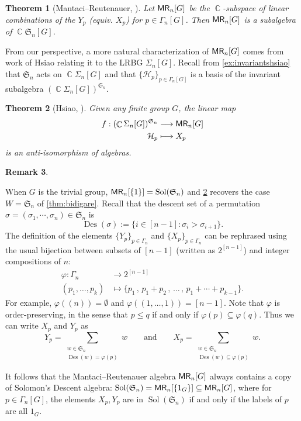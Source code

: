 \documentclass[11pt, oneside, reqno]{amsart}
\newtheorem{theorem}{Theorem}[section]
\theoremstyle{definition}
\newtheorem{remark}[theorem]{Remark}
\numberwithin{equation}{section}
\DeclareMathOperator{\C}{\mathbb{C}}
\DeclareMathOperator{\Des}{Des}
\def \MR {{\sf{MR}}}
\def \kk{\C}
\def \sym{\mathfrak{S}}
\def \gsetcomposition{{\Sigma_n[G]}}
\def \hsiao {{\gsetcomposition}}
\def\qqand{\qquad\text{and}\qquad}
\DeclareMathOperator{\sol}{Sol}
\newcommand{\SB}[1]{\mathcal{#1}} 		%
\begin{document}
\begin{theorem}[Mantaci--Reutenauer, \cite{MR95}]\label{thm/def:mralg}
    Let  $\MR_n[G]$ be the $\kk$-subspace of linear combinations of the $Y_{p}$ (equiv. $X_{p}$) for $p \in \Gamma_n[G]$.
    Then $\MR_n[G]$ is a subalgebra of $\kk \sym_n[G]$.
\end{theorem}

From our perspective, a more natural characterization of $\MR_n[G]$ comes from work of Hsiao relating it to the LRBG $\hsiao$.
Recall from \cref{ex:invariantshsiao} that $\sym_n$ acts on $\kk \hsiao$ and that $\{ \SB{H}_p \}_{p \in \Gamma_n[G]}$ is a basis of the invariant subalgebra $(\kk \hsiao)^{\sym_n}$.

\begin{theorem}[Hsiao, \cite{hsiao2007semigroup}]\label{thm:hsiao} 
    Given any finite group $G$, the linear map
    \begin{align*}
        f : (\kk \hsiao)^{\sym_n}   & \longrightarrow   \MR_n[G] \\
                \SB{H}_{p}     &  \longmapsto     X_{p}
    \end{align*}
    is an anti-isomorphism of algebras.
\end{theorem}

\begin{remark} \rm \label{rmk:descentscompositions}
    
    When $G$ is the trivial group, $\MR_n[\{1\}] = \sol(\sym_n)$ and \cref{thm:hsiao} recovers the case $W = \sym_n$ of \cref{thm:bidigare}.
    Recall that the descent set of a permutation $\sigma = (\sigma_1, \cdots, \sigma_n) \in \sym_n$ is 
    \[
        \Des(\sigma) := \{ i \in [n-1]: \sigma_i > \sigma_{i+1} \}.
    \]
    The definition of the elements $\{ Y_{p} \}_{p \in \Gamma_n}$ and $\{ X_{p} \}_{p \in \Gamma_n}$ can be rephrased
    using the usual bijection between subsets of $[n-1]$ (written as $2^{[n-1]}$) and integer compositions of $n$:
    \begin{align*}
        \varphi: \Gamma_n &\longrightarrow 2^{[n-1]}\\
        (p_1, \ldots, p_k) & \longmapsto \{ p_1 \,,\, p_1 + p_2 \,,\, \ldots \,,\, p_1 + \cdots + p_{k-1} \}.
    \end{align*}
    For example, $\varphi((n)) = \emptyset$ and $\varphi((1,\dots,1)) = [n-1]$.
    Note that $\varphi$ is order-preserving, in the sense that $p \leq q$ if and only if $\varphi(p) \subseteq \varphi(q)$.
    Thus we can write $X_{p}$ and $Y_{p}$ as
    \[
         Y_{p} = \sum_{\substack{w \in \sym_n \\ \Des(w) = \varphi(p) }} w
         \qqand
         X_{p} = \sum_{\substack{w \in \sym_n \\ \Des(w) \subseteq \varphi(p)}} w.
    \]
    
    It follows that the Mantaci--Reutenauer algebra $\MR_n[G]$ always contains a copy of Solomon's Descent algebra: $\sol(\sym_n) = \MR_n[\{1_G\}] \subseteq \MR_n[G]$,
    where for $p \in \Gamma_n[G]$, the elements $X_{p}, Y_{p}$ are in $\sol(\sym_n)$ if and only if the labels of $p$ are all $1_G$.
\end{remark}
\end{document}

